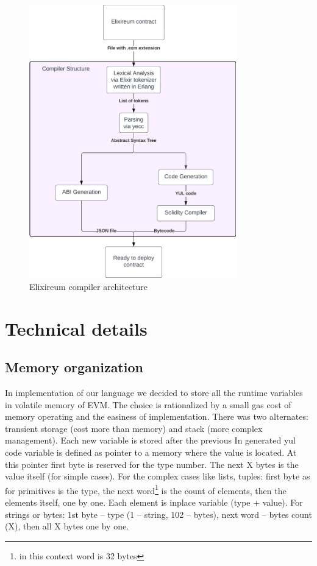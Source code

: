 \begin{figure}[h!]
    \centering
    \includegraphics[width=0.8\textwidth]{figs/arch.png}
    \caption{Elixireum compiler architecture}
    \label{fig:arch}
\end{figure}

\section{Technical details}

\subsection{Memory organization}
\label{sec:memory_organization}

In implementation of our language we decided to store all the runtime variables in volatile memory of EVM. The choice is rationalized by a small gas cost of memory operating and the easiness of implementation. There was two alternates: transient storage (cost more than memory) and stack (more complex management). Each new variable is stored after the previous
In generated yul code variable is defined as pointer to a memory where the value is located. At this pointer first byte is reserved for the type number. The next X bytes is the value itself (for simple cases). For the complex cases like lists, tuples: first byte as for primitives is the type, the next word\footnote{in this context word is 32 bytes} is the count of elements, then the elements itself, one by one. Each element is inplace variable (type + value). For strings or bytes: 1st byte -- type (1 -- string, 102 -- bytes), next word -- bytes count (X), then all X bytes one by one.

